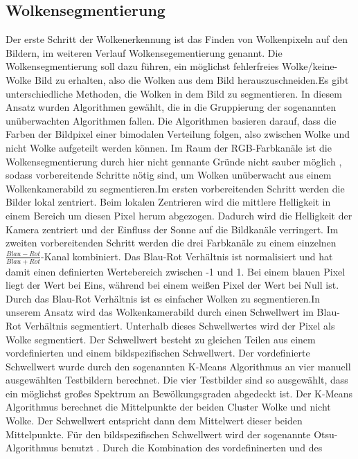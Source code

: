 \documentclass[a4paper,11pt,twoside,german]{article}
\newcommand{\absatz}{\smallbreak}
\begin{document}
\subsection{Wolkensegmentierung}
Der erste Schritt der Wolkenerkennung ist das Finden von Wolkenpixeln auf den
Bildern, im weiteren Verlauf Wolkensegementierung genannt. Die
Wolkensegmentierung soll dazu führen, ein möglichst fehlerfreies
Wolke/keine-Wolke Bild zu erhalten, also die Wolken aus dem Bild
herauszuschneiden.\absatz Es gibt unterschiedliche Methoden, die Wolken in dem
Bild zu segmentieren. In diesem Ansatz wurden Algorithmen gewählt, die in
die Gruppierung der sogenannten unüberwachten Algorithmen fallen. Die
Algorithmen basieren darauf, dass die Farben der Bildpixel einer bimodalen
Verteilung folgen, also zwischen Wolke und nicht Wolke aufgeteilt werden können.
Im Raum der RGB-Farbkanäle ist die Wolkensegmentierung durch hier nicht gennante
Gründe nicht sauber möglich \citep{dev_14_color}, sodass vorbereitende Schritte
nötig sind, um Wolken unüberwacht aus einem Wolkenkamerabild zu
segmentieren.\absatz Im ersten vorbereitenden Schritt werden die Bilder lokal
zentriert. Beim lokalen Zentrieren wird die mittlere Helligkeit in einem Bereich
um diesen Pixel herum abgezogen. Dadurch wird die Helligkeit der Kamera
zentriert und der Einfluss der Sonne auf die Bildkanäle verringert. Im zweiten
vorbereitenden Schritt werden die drei Farbkanäle zu einem einzelnen
$\frac{Blau-Rot}{Blau+Rot}$-Kanal kombiniert. Das Blau-Rot Verhältnis ist
normalisiert und hat damit einen definierten Wertebereich zwischen -1 und 1. Bei
einem blauen Pixel liegt der Wert bei Eins, während bei einem weißen Pixel der
Wert bei Null ist. Durch das Blau-Rot Verhältnis ist es einfacher Wolken zu
segmentieren.\absatz In unserem Ansatz wird das Wolkenkamerabild durch einen
Schwellwert im Blau-Rot Verhältnis segmentiert. Unterhalb dieses Schwellwertes
wird der Pixel als Wolke segmentiert. Der Schwellwert besteht zu gleichen Teilen
aus einem vordefinierten und einem bildspezifischen Schwellwert. Der
vordefinierte Schwellwert wurde durch den sogenannten K-Means Algorithmus
\citep{james_13_introduction} an vier manuell ausgewählten Testbildern
berechnet. Die vier Testbilder sind so ausgewählt, dass ein möglichst großes
Spektrum an Bewölkungsgraden abgedeckt ist. Der K-Means Algorithmus berechnet
die Mittelpunkte der beiden Cluster Wolke und nicht Wolke. Der Schwellwert
entspricht dann dem Mittelwert dieser beiden Mittelpunkte. Für den
bildspezifischen Schwellwert wird der sogenannte Otsu-Algorithmus benutzt
\citep{otsu_75_threshold}. Durch die Kombination des vordefininerten und des
\end{document}
